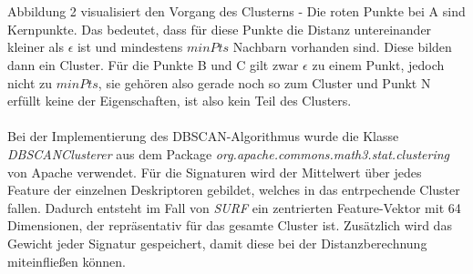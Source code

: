 \documentclass{scrartcl}
\begin{document}
\\
\\
Abbildung 2 visualisiert den Vorgang des Clusterns - Die roten Punkte bei A sind Kernpunkte. Das bedeutet, dass für diese Punkte die Distanz untereinander kleiner als $\epsilon$ ist und mindestens $minPts$ Nachbarn vorhanden sind. Diese bilden dann ein Cluster. Für die Punkte B und C gilt zwar $\epsilon$ zu einem Punkt, jedoch nicht zu $minPts$, sie gehören also gerade noch so zum Cluster und Punkt N erfüllt keine der Eigenschaften, ist also kein Teil des Clusters.  
\\
\\
Bei der Implementierung des DBSCAN-Algorithmus wurde die Klasse \textit{DBSCANClusterer} aus dem Package \textit{org.apache.commons.math3.stat.clustering} von Apache verwendet. Für die Signaturen wird der Mittelwert über jedes Feature der einzelnen Deskriptoren gebildet, welches in das entrpechende Cluster fallen. Dadurch entsteht im Fall von \textit{SURF} ein zentrierten Feature-Vektor mit 64 Dimensionen, der repräsentativ für das gesamte Cluster ist. Zusätzlich wird das Gewicht jeder Signatur gespeichert, damit diese bei der Distanzberechnung miteinfließen können.
\end{document}
